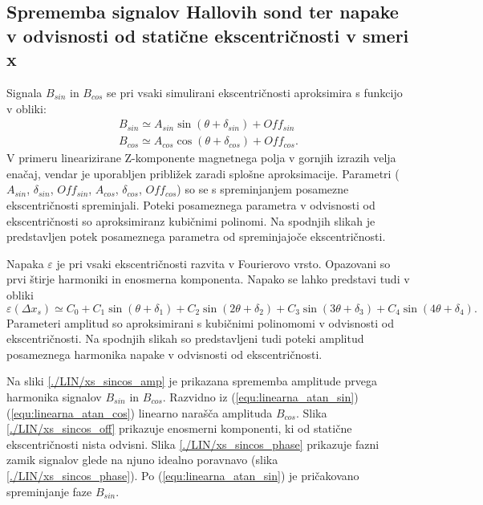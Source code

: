 \subsection{Sprememba signalov Hallovih sond ter napake v odvisnosti od statične ekscentričnosti v smeri x}
Signala $B_{sin}$ in $B_{cos}$ se pri vsaki simulirani ekscentričnosti aproksimira s funkcijo v obliki:
\begin{eqnarray}
B_{sin} \simeq A_{sin} \sin (\theta + \delta_{sin})+ Off_{sin}\\
B_{cos} \simeq A_{cos} \cos (\theta + \delta_{cos})+ Off_{cos}.
\end{eqnarray}
V primeru linearizirane Z-komponente magnetnega polja v gornjih izrazih velja enačaj, vendar je uporabljen približek zaradi splošne aproksimacije. Parametri ($A_{sin}$, $\delta_{sin}$, $Off_{sin}$, $A_{cos}$, $\delta_{cos}$, $Off_{cos}$) so se s spreminjanjem posamezne ekscentričnosti spreminjali. Poteki posameznega parametra v odvisnosti od ekscentričnosti so aproksimiranz kubičnimi polinomi.
Na spodnjih slikah je predstavljen potek posameznega parametra od spreminjajoče ekscentričnosti.

Napaka $\varepsilon$ je pri vsaki ekscentričnosti razvita v Fourierovo vrsto. Opazovani so prvi štirje harmoniki in enosmerna komponenta. Napako se lahko predstavi tudi v obliki
\begin{equation}
\varepsilon (\Delta x_s) \simeq C_0 + C_1 \sin (\theta + \delta_1)
+ C_2 \sin (2 \theta + \delta_2)
+ C_3 \sin (3 \theta + \delta_3)
+ C_4 \sin (4 \theta + \delta_4).
\end{equation}
Parameteri amplitud so  aproksimirani s kubičnimi polinomomi v odvisnosti od ekscentričnosti.
Na spodnjih slikah so predstavljeni tudi poteki amplitud posameznega harmonika napake v odvisnosti od ekscentričnosti.

Na sliki \ref{./LIN/xs_sincos_amp} je prikazana sprememba amplitude prvega harmonika signalov $B_{sin}$ in $B_{cos}$. Razvidno iz (\ref{equ:linearna_atan_sin})  (\ref{equ:linearna_atan_cos}) linearno narašča amplituda $B_{cos}$. Slika \ref{./LIN/xs_sincos_off} prikazuje enosmerni komponenti, ki od statične ekscentričnosti nista odvisni. Slika \ref{./LIN/xs_sincos_phase} prikazuje fazni zamik signalov glede na njuno idealno poravnavo (slika \ref{./LIN/xs_sincos_phase}). Po (\ref{equ:linearna_atan_sin}) je pričakovano spreminjanje faze $B_{sin}$.

